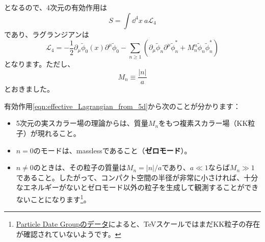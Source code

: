 \documentclass[unicode,a4paper,11pt]{ltjsarticle}
\begin{document}
となるので、4次元の有効作用は
\begin{equation}
   S
   =
   \int\dd^4 x\ a\mathcal{L}_{4}
\end{equation}
であり、ラグランジアンは
\begin{equation}
   \mathcal{L}_{4}
   =
   -\frac{1}{2}\partial_{\mu}\tilde{\phi}_{0}(x)\partial^{\mu}\tilde{\phi}_{0}
   -\sum_{n\geq 1}
   \left(
   \partial_{\mu}\tilde{\phi}_{n}\partial^{\mu}\tilde{\phi}_{n}^{\ast}
   +
   M_{n}^{n}\tilde{\phi}_{n}\tilde{\phi}_{n}^{\ast}
   \right)
   \label{eqn:effective_Lagrangian_from_5d}
\end{equation}
となります。ただし、
\begin{equation}
   M_{n}
   \equiv
   \frac{|n|}{a}
\end{equation}
とおきました。

有効作用\eqref{eqn:effective_Lagrangian_from_5d}から次のことが分かります：
\begin{itemize}
   \item
         5次元の実スカラー場の理論からは、質量$M_{n}$をもつ複素スカラー場（KK粒子）が現れること。
   \item
         $n=0$のモードは、masslessであること（\textbf{ゼロモード}）。
   \item
         $n\neq 0$のときは、その粒子の質量は$M_{n}=|n|/a$であり、$a\ll 1$ならば$M_{n}\gg 1$であること。したがって、コンパクト空間の半径が非常に小さければ、十分なエネルギーがないとゼロモード以外の粒子を生成して観測することができないことになります\footnote{
            \href{https://pdg.lbl.gov/2023/tables/rpp2023-sum-searches.pdf}{Particle Date Groupのデータ}によると、TeVスケールではまだKK粒子の存在が確認されていないようです。
         }。
\end{itemize}
\end{document}
